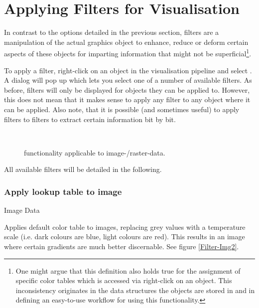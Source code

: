 \section{Applying Filters for Visualisation}
\label{filters}

In contrast to the options detailed in the previous section, filters are a manipulation of the actual graphics object to enhance, reduce or deform certain aspects of these objects for imparting information that might not be superficial\footnote{One might argue that this definition also holds true for the assignment of specific color tables which is accessed via right-click on an object. This inconsistency originates in the data structures the objects are stored in and in defining an easy-to-use workflow for using this functionality.}.

To apply a filter, right-click on an object in the visualisation pipeline and select . A dialog will pop up which lets you select one of a number of available filters. As before, filters will only be displayed for objects they can be applied to. However, this does not mean that it makes sense to apply any filter to any object where it can be applied. Also note, that it is possible (and sometimes useful) to apply filters to filters to extract certain information bit by bit.
%
\begin{figure}[tb]
\begin{center}
\enspace
{} \\
\enspace
{}
\end{center}
\caption{\ogs functionality applicable to image-/raster-data.} \label{fig:filter:raster}
\end{figure}
%
All available filters will be detailed in the following.

\subsubsection{Apply lookup table to image}
 Image Data

 Applies default color table to images, replacing grey values with a temperature scale (i.e. dark colours are blue, light colours are red). This results in an image where certain gradients are much better discernable. See figure \ref{Filter-Img2}.

